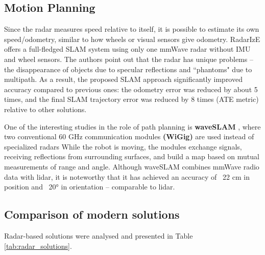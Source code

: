 \subsection{Motion Planning}


Since the radar measures speed relative to itself, it is possible to estimate its own speed/odometry, similar to how wheels or visual sensors give odometry. RadarIzE\citep{10.1145/3643832.3661871} offers a full-fledged SLAM system using only one mmWave radar without IMU and wheel sensors. The authors point out that the radar has unique problems – the disappearance of objects due to specular reflections and “phantoms" due to multipath. As a result, the proposed SLAM approach significantly improved accuracy compared to previous ones: the odometry error was reduced by about 5 times, and the final SLAM trajectory error was reduced by 8 times (ATE metric) relative to other solutions.

One of the interesting studies in the role of path planning is \textbf{waveSLAM} \citep{picazo2023waveslam}, where two conventional 60 GHz communication modules \textbf{(WiGig)} are used instead of specialized radars While the robot is moving, the modules exchange signals, receiving reflections from surrounding surfaces, and build a map based on mutual measurements of range and angle. Although waveSLAM combines mmWave radio data with lidar, it is noteworthy that it has achieved an accuracy of ~22 cm in position and ~20° in orientation – comparable to lidar.


\subsection{Comparison of modern solutions}
\noindent
Radar-based solutions were analysed and presented in Table \ref{tab:radar_solutions}.


